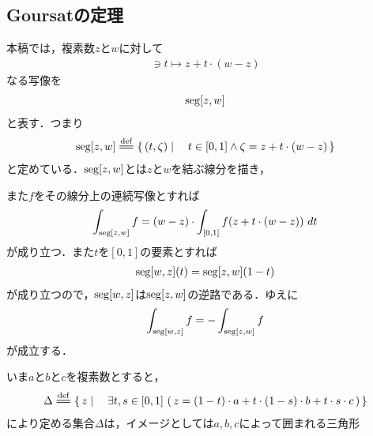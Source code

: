 \subsection{Goursatの定理}
	本稿では，複素数$z$と$w$に対して
	\begin{align}
		[0,1] \ni t \longmapsto z + t \cdot (w - z)
	\end{align}
	なる写像を
	\begin{align}
		\operatorname{seg}[z,w]
	\end{align}
	と表す．つまり
	\begin{align}
		\seg{z}{w} \defeq \Set{(t,\zeta)}{t \in [0,1] \wedge \zeta = z + t \cdot (w - z)}
	\end{align}
	と定めている．$\operatorname{seg}[z,w]$とは$z$と$w$を結ぶ線分を描き，
	
	\begin{center}
	\end{center}
	
	また$f$をその線分上の連続写像とすれば
	\begin{align}
		\int_{\operatorname{seg}[z,w]} f = (w-z) \cdot \int_{[0,1]} f(z + t \cdot (w - z))\ dt
	\end{align}
	が成り立つ．また$t$を$[0,1]$の要素とすれば
	\begin{align}
		\operatorname{seg}[w,z](t) = \operatorname{seg}[z,w](1 - t)
	\end{align}
	が成り立つので，$\operatorname{seg}[w,z]$は$\operatorname{seg}[z,w]$の逆路である．ゆえに
	\begin{align}
		\int_{\operatorname{seg}[w,z]} f = - \int_{\operatorname{seg}[z,w]} f
	\end{align}
	が成立する．
	
	いま$a$と$b$と$c$を複素数とすると，
	\begin{align}
		\Delta \defeq \Set{z}{\exists t,s \in [0,1]\, 
		\left(\, z = (1-t) \cdot a 
		+ t \cdot (1-s) \cdot b 
		+ t \cdot s \cdot c\, \right)}
	\end{align}
	により定める集合$\Delta$は，イメージとしては$a,b,c$によって囲まれる三角形
	
	\begin{center}
	\end{center}
	
